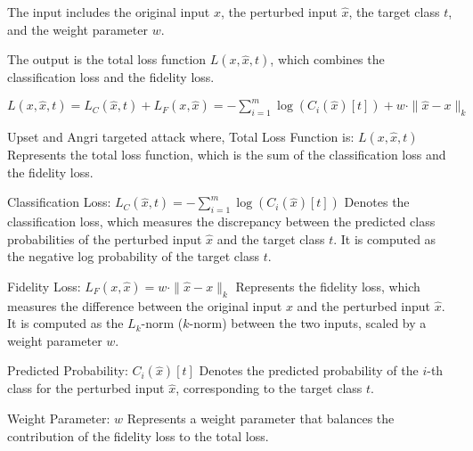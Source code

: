 The input includes the original input $x$, the perturbed input $\hat{x}$, the target class $t$, and the weight parameter $w$.

The output is the total loss function $L(x, \hat{x}, t)$, which combines the classification loss and the fidelity loss.

$L(x, \hat{x}, t) = L_C(\hat{x}, t) + L_F(x, \hat{x}) = -\sum_{i=1}^{m} \log(C_i(\hat{x})[t]) + w \cdot \| \hat{x} - x \|_k$

Upset and Angri targeted attack where, Total Loss Function is:
$L(x, \hat{x}, t)$
Represents the total loss function, which is the sum of the classification loss and the fidelity loss.

Classification Loss:
$L_C(\hat{x}, t) = -\sum_{i=1}^{m} \log(C_i(\hat{x})[t])$
Denotes the classification loss, which measures the discrepancy between the predicted class probabilities of the perturbed input $\hat{x}$ and the target class $t$. It is computed as the negative log probability of the target class $t$.

Fidelity Loss:
$L_F(x, \hat{x}) = w \cdot \| \hat{x} - x \|_k$
Represents the fidelity loss, which measures the difference between the original input $x$ and the perturbed input $\hat{x}$. It is computed as the $L_k$-norm ($k$-norm) between the two inputs, scaled by a weight parameter $w$.

Predicted Probability:
 $C_i(\hat{x})[t]$
Denotes the predicted probability of the $i$-th class for the perturbed input $\hat{x}$, corresponding to the target class $t$.

Weight Parameter:
$w$
Represents a weight parameter that balances the contribution of the fidelity loss to the total loss.
